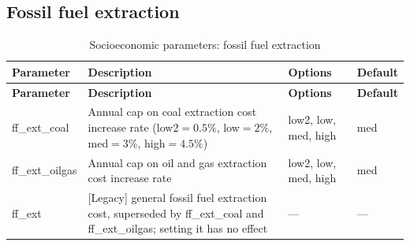 \documentclass[10pt,a4paper,titlepage,dvipdfmx]{book}
\begin{document}
\subsection{Fossil fuel extraction}
\begin{longtable}{|p{}|p{}|p{}|p{}|}
\caption{Socioeconomic parameters: fossil fuel extraction}\label{tab:sp-soc-ffext}\\
\hline
\textbf{Parameter} & \textbf{Description} & \textbf{Options} & \textbf{Default} \\ \hline
\endfirsthead
\hline
\textbf{Parameter} & \textbf{Description} & \textbf{Options} & \textbf{Default} \\ \hline
\endhead
\hline
\endfoot
ff\_ext\_coal & Annual cap on coal extraction cost increase rate (low2$=0.5\%$, low$=2\%$, med$=3\%$, high$=4.5\%$) & low2, low, med, high & med \\ \hline
ff\_ext\_oilgas & Annual cap on oil and gas extraction cost increase rate & low2, low, med, high & med \\ \hline
ff\_ext & [Legacy] general fossil fuel extraction cost, superseded by ff\_ext\_coal and ff\_ext\_oilgas; setting it has no effect & --- & --- \\ \hline
\end{longtable}
\end{document}
